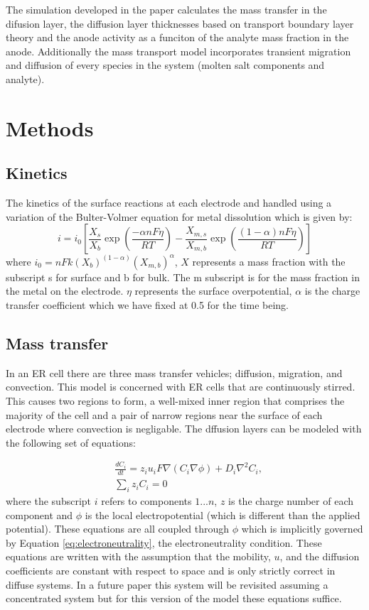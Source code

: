 \documentclass[journal=mamobx, layout=twocolumn]{achemso}
\begin{document}
The simulation developed in the paper calculates the mass transfer in the difusion layer, the diffusion layer thicknesses based on transport boundary layer theory and the anode activity as a funciton of the analyte mass fraction in the anode. 
Additionally the mass transport model incorporates transient migration and diffusion of every species in the system (molten salt components and analyte).


\section{Methods}
\subsection{Kinetics}
The kinetics of the surface reactions at each electrode and handled using a variation of the Bulter-Volmer equation for metal dissolution which is given by:
\begin{equation}
  i = i_0\left [\frac{X_s}{X_b}\exp\left (\frac{-\alpha nF\eta}{RT}\right ) 
- \frac{X_{m,s}}{X_{m,b}}\exp\left (\frac{(1-\alpha)nF\eta}{RT}\right )\right ]
\end{equation}
where $i_0 = nFk(X_b)^{(1-\alpha)}(X_{m,b})^\alpha$, $X$ represents a mass fraction with the subscript s for surface and b for bulk.
The m subscript is for the mass fraction in the metal on the electrode. $\eta$ represents the surface overpotential, $\alpha$ is the charge transfer coefficient which we have fixed at 0.5 for the time being.  
\subsection{Mass transfer}
In an ER cell there are three mass transfer vehicles; diffusion, migration, and convection. 
This model is concerned with ER cells that are continuously stirred. 
This causes two regions to form, a well-mixed inner region that comprises the majority of the cell and a pair of narrow regions near the surface of each electrode where convection is negligable.
The dffusion layers can be modeled with the following set of equations:

\begin{align}
    & \frac{dC_i}{dt} = z_iu_iF\nabla (C_i\nabla \phi) + D_i \nabla^2C_i, \label{eq:migration_diffusion}\\ 
    & \sum_i z_i C_i = 0 \label{eq:electroneutrality}
\end{align}
where the subscript $i$ refers to components ${1...n}$, $z$ is the charge number of each component and $\phi$ is the local electropotential (which is different than the applied potential).
These equations are all coupled through $\phi$ which is implicitly governed by Equation \ref{eq:electroneutrality}, the electroneutrality condition.
These equations are written with the assumption that the mobility, $u$, and the diffusion coefficients are constant with respect to space and is only strictly correct in diffuse systems. 
In a future paper this system will be revisited assuming a concentrated system but for this version of the model these equations suffice.
\end{document}
